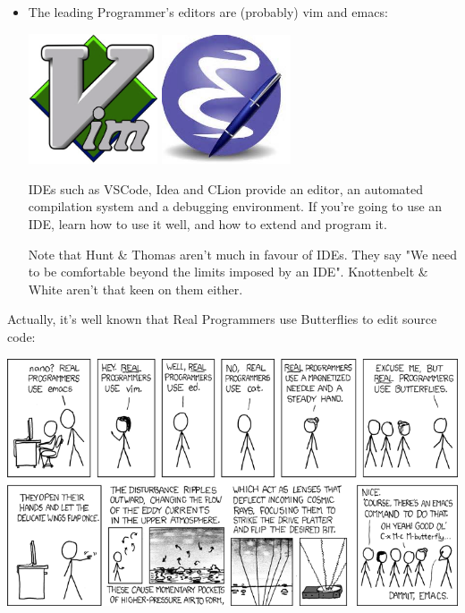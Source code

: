 \documentclass[handout]{beamer}
\begin{document}
\begin{frame}
  \begin{itemize}
    \item
       The leading Programmer's editors are (probably) \alert{vim} and \alert{emacs}:

\includegraphics[width=0.3\textwidth]{vimLogo}
\includegraphics[width=0.3\textwidth]{emacsLogo}

    \pitem IDEs such as \alert{VSCode}, \alert{Idea} and \alert{CLion}
          provide an editor, an automated compilation system
	  and a debugging environment.
	  If you're going to use an IDE,
          learn how to use it well, and
          how to extend and program it.

     \pitem
     Note that \alert{Hunt \& Thomas} aren't much in favour of IDEs.
     They say "We need to be comfortable beyond the limits imposed by an IDE".
     Knottenbelt \& White aren't that keen on them either.
  \end{itemize}
\end{frame}

\begin{frame}
Actually, it's well known that \alert{Real Programmers use Butterflies}
to edit source code:

\centering
\vspace{10pt}
\includegraphics[height=0.8\textheight]{real_programmers.png}

\end{frame}
\end{document}
